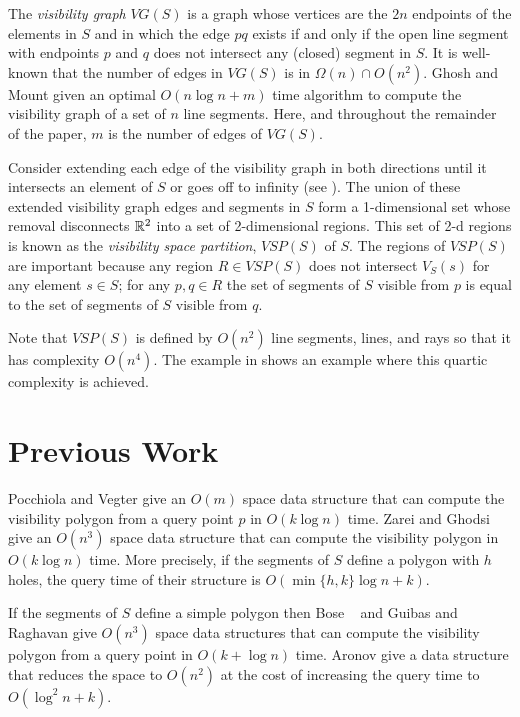 \documentclass{patmorin}
\newcommand{\VG}{\mathit{VG}}
\newcommand{\VSP}{\mathit{VSP}}
\begin{document}
The \emph{visibility graph} $\VG(S)$ is a graph whose vertices are the $2n$
endpoints of the elements in $S$ and in which the edge $pq$ exists if and
only if the open line segment with endpoints $p$ and $q$ does not intersect
any (closed) segment in $S$.  It is well-known that the number of edges in
$\VG(S)$ is in $\Omega(n)\cap O(n^2)$.  Ghosh and Mount given an optimal
$O(n\log n+ m)$ time algorithm to compute the visibility graph of a set of
$n$ line segments.  Here, and throughout the remainder of the paper, $m$ is
the number of edges of $\VG(S)$.

Consider extending each edge of the visibility graph in both directions
until it intersects an element of $S$ or goes off to infinity (see
). The union of these extended visibility graph edges and
segments in $S$ form a 1-dimensional set whose removal disconnects $\mathbb{R}^2$
into a set of 2-dimensional regions.  This set of 2-d regions is known as
the \emph{visibility space partition}, $\VSP(S)$ of $S$.  The regions of
$\VSP(S)$ are important because any region $R\in\VSP(S)$ does not intersect
$V_S(s)$ for any element $s\in S$;  for any $p,q\in R$ the set of segments
of $S$ visible from $p$ is equal to the set of segments of $S$ visible from
$q$.  

Note that $\VSP(S)$ is defined by $O(n^2)$ line segments, lines, and rays
so that it has complexity $O(n^4)$.  The example in  shows
an example where this quartic complexity is achieved.

\section{Previous Work}

Pocchiola and Vegter \cite{pvXX} give an $O(m)$ space data structure that
can compute the visibility polygon from a query point $p$ in $O(k \log n)$
time.  Zarei and Ghodsi give an $O(n^3)$ space data structure that can compute
the visibility polygon in $O(k \log n)$ time.  More precisely, if the
segments of $S$ define a polygon with $h$ holes, the query time of their
structure is $O(\min\{h,k\}\log n + k)$.

If the segments of $S$ define a simple polygon then Bose \etal\ \cite{X}
and Guibas and Raghavan \cite{X} give $O(n^3)$ space data structures that
can compute the visibility polygon from a query point in $O(k + \log n)$
time.  Aronov \etal \cite{axxX} give a data structure that reduces the
space to $O(n^2)$ at the cost of increasing the query time to $O(\log^2 n +
k)$.
\end{document}
